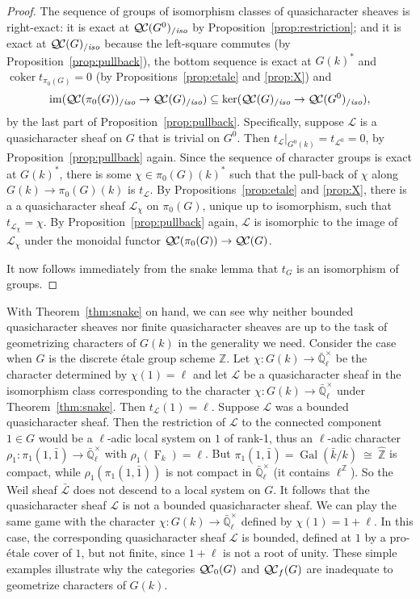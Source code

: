 \documentclass[11pt]{amsart}
\theoremstyle{plain}
\theoremstyle{definition}
\theoremstyle{remark}
\newcommand{\ZZ}{{\mathbb{Z}}}
\newcommand{\EE}{\mathbb{\bar Q}_\ell}
\newcommand{\bFq}{\bar{k}}
\newcommand{\Fq}{k}
\newcommand{\EEx}{\EE^\times}
\DeclareMathOperator{\Gal}{Gal}
\newcommand{\Frob}[1]{\operatorname{F}_{#1}}
\DeclareMathOperator{\coker}{coker}
\newcommand{\iso}{{\ \cong\ }}
\newcommand{\qcs}[1]{{\mathcal{#1}}}
\newcommand{\gqcs}[1]{{\mathcal{\bar #1}}}
\newcommand{\QC}{{\mathcal{Q\hskip-0.8pt C}}}
\newcommand{\QCb}{{\QC_0}}
\newcommand{\QCf}{{\QC_f}}
\newcommand{\QCiso}[1]{\QC(#1)_{/\textit{iso}}}
\newcommand{\image}{{\operatorname{im}}}
\newcommand{\trFrob}[1]{t_{#1}}
\begin{document}
\begin{proof}
  The sequence of groups of isomorphism classes of quasicharacter sheaves is right-exact: it is exact at
  $\QCiso{G^0}$ by Proposition~\ref{prop:restriction}; and
  it is exact at $\QCiso{G}$ because the left-square
  commutes (by Proposition~\ref{prop:pullback}), the bottom sequence
  is exact at $G(\Fq)^*$ and $\coker \trFrob{\pi_0(G)} =0$
  (by Propositions~\ref{prop:etale} and \ref{prop:X}) and
  \[
  \image(\QCiso{\pi_0(G)} \to \QCiso{G}) \subseteq \ker(\QCiso{G} \to \QCiso{G^0}),
  \]
  by the last part of Proposition~\ref{prop:pullback}. Specifically,
  suppose $\qcs{L}$ is a quasicharacter sheaf on $G$ that is trivial on
  $G^0$. Then $\trFrob{\qcs{L}}\vert_{G^0(\Fq)} = \trFrob{\qcs{L}^0} =0$,
  by Proposition~\ref{prop:pullback} again. Since the sequence of
  character groups is exact at $G(\Fq)^*$, there is
  some $\chi \in \pi_0(G)(\Fq)^*$ such that the
  pull-back of $\chi$ along $G(\Fq)\to \pi_0(G)(\Fq)$ is
  $\trFrob{\qcs{L}}$. By Propositions~\ref{prop:etale} and \ref{prop:X},
  there is a a quasicharacter sheaf $\qcs{L}_\chi$ on $\pi_0(G)$, unique up
  to isomorphism, such that $\trFrob{\qcs{L}_\chi} = \chi$. By
  Proposition~\ref{prop:pullback} again, $\qcs{L}$ is isomorphic to the
  image of $\qcs{L}_\chi$ under the monoidal functor $\QC(\pi_0(G)) \to \QC(G)$.

  It now follows immediately from the snake lemma that $\trFrob{G}$ is an
  isomorphism of groups.
\end{proof}

With Theorem~\ref{thm:snake} on hand, 
we can see why neither bounded quasicharacter sheaves 
nor finite quasicharacter sheaves are up to the task of 
geometrizing characters of $G(\Fq)$ in the generality we need.  
%
Consider the case when $G$ is the discrete \'etale group scheme $\ZZ$. 
Let $\chi : G(\Fq) \to \EEx$ be the character determined by $\chi(1) = \ell$ 
and let $\qcs{L}$ be a quasicharacter sheaf in the isomorphism class 
corresponding to the character $\chi : G(\Fq) \to \EEx$ under Theorem~\ref{thm:snake}. 
Then $\trFrob{\qcs{L}}(1) = \ell$. Suppose $\qcs{L}$ was a bounded quasicharacter sheaf. 
Then the restriction of $\qcs{L}$ to the connected component $1\in G$ 
would be a $\ell$-adic local system on $1$ of rank-1, 
thus an $\ell$-adic character $\rho_1 : \pi_1(1,{\bar 1}) \to \EEx$ with
$\rho_1(\Frob{\Fq}) = \ell$. But $\pi_1(1,{\bar 1}) = \Gal(\bFq/\Fq) \iso {\hat \ZZ}$ is compact, 
while $\rho_1(\pi_1(1,{\bar 1}))$ is not compact in $\EEx$ (it contains $\ell^\ZZ$). 
So the Weil sheaf $\gqcs{L}$ does not descend to a local system on $G$.
It follows that the quasicharacter sheaf $\qcs{L}$ is not a bounded quasicharacter sheaf.
%
We can play the same game with the character $\chi : G(\Fq) \to \EEx$ 
defined by $\chi(1) = 1+\ell$. In this case, the corresponding quasicharacter sheaf $\qcs{L}$ is bounded,
defined at $1$ by a pro-\'etale cover of $1$, but not finite, since $1+\ell$ is not a root of unity. 
%
These simple examples illustrate why the categories $\QCb(G)$ and $\QCf(G)$ are inadequate to geometrize characters of $G(\Fq)$.
\end{document}
